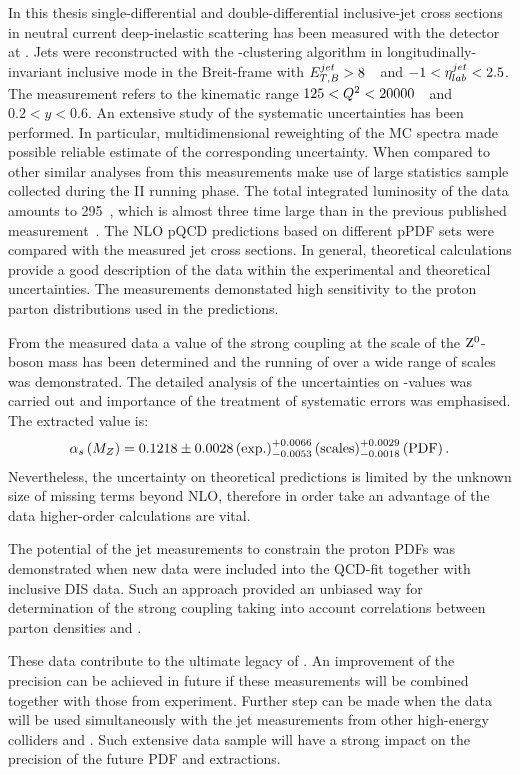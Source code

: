 In this thesis single-differential and double-differential inclusive-jet cross sections in neutral current deep-inelastic scattering has been measured with the \zeus detector at \hera. Jets were reconstructed with the \kt-clustering algorithm in longitudinally-invariant inclusive mode in the Breit-frame with $\mbox{$E_{T,B}^{jet}$} > 8$~\GeV~and $-1<\mbox{$\eta^{jet}_{lab}$}<2.5$. The measurement refers to the kinematic range $125 < \mbox{${Q^2}$} < 20000$~\GeV~and $0.2<y<0.6$. An extensive study of the systematic uncertainties has been performed. In particular, multidimensional reweighting of the MC spectra made possible reliable estimate of the corresponding uncertainty. When compared to other similar analyses from \zeus this measurements make use of large statistics sample collected during the \hera II running phase. The total integrated luminosity of the data amounts to 295~\invpb, which is almost three time large than in the previous published measurement~\cite{inclusivejetDIS}. The NLO pQCD predictions based on different pPDF sets were compared with the measured jet cross sections. In general, theoretical calculations provide a good description of the data within the experimental and theoretical uncertainties. The measurements demonstated high sensitivity to the proton parton distributions used in the predictions.

From the measured data a value of the strong coupling at the scale of the $\mbox{$\rm{Z}^0$}$-boson mass has been determined and the running of \as over a wide range of scales was demonstrated. The detailed analysis of the uncertainties on \asz-values was carried out and importance of the treatment of systematic errors was emphasised. The extracted \asz value is:
\begin{equation}
 \mbox{$\alpha_{s}\left(M_{Z}\right)$} = 0.1218 \pm 0.0028\left(\text{exp.}\right)^{+0.0066}_{-0.0053}\left(\text{scales}\right)^{+0.0029}_{-0.0018}\left(\text{PDF}\right).
\end{equation}
Nevertheless, the uncertainty on theoretical predictions is limited by the unknown size of missing terms beyond NLO, therefore in order take an advantage of the data higher-order calculations are vital.
 
The potential of the jet measurements to constrain the proton PDFs was demonstrated when new data were included into the QCD-fit together with inclusive DIS data. Such an approach provided an unbiased way for determination of the strong coupling taking into account correlations between parton densities and \as.

These data contribute to the ultimate legacy of \hera. An improvement of the precision can be achieved in future if these measurements will be combined together with those from \hone experiment. Further step can be made when the \hera data will be used simultaneously with the jet measurements from other high-energy colliders \lhc and \tevatron. Such extensive data sample will have a strong impact on the precision of the future PDF and \as extractions.

